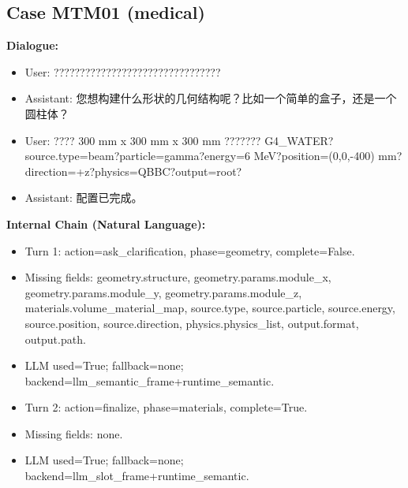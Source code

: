\documentclass[11pt]{ctexart}
\begin{document}
\subsection{Case MTM01 (medical)}
\textbf{Dialogue:}
\begin{itemize}
\item User: ????????????????????????????????
\item Assistant: 您想构建什么形状的几何结构呢？比如一个简单的盒子，还是一个圆柱体？
\item User: ???? 300 mm x 300 mm x 300 mm ??????? G4\_WATER?source.type=beam?particle=gamma?energy=6 MeV?position=(0,0,-400) mm?direction=+z?physics=QBBC?output=root?
\item Assistant: 配置已完成。
\end{itemize}
\textbf{Internal Chain (Natural Language):}
\begin{itemize}
\item Turn 1: action=ask\_clarification, phase=geometry, complete=False.
\item Missing fields: geometry.structure, geometry.params.module\_x, geometry.params.module\_y, geometry.params.module\_z, materials.volume\_material\_map, source.type, source.particle, source.energy, source.position, source.direction, physics.physics\_list, output.format, output.path.
\item LLM used=True; fallback=none; backend=llm\_semantic\_frame+runtime\_semantic.
\item Turn 2: action=finalize, phase=materials, complete=True.
\item Missing fields: none.
\item LLM used=True; fallback=none; backend=llm\_slot\_frame+runtime\_semantic.
\end{itemize}
\end{document}
